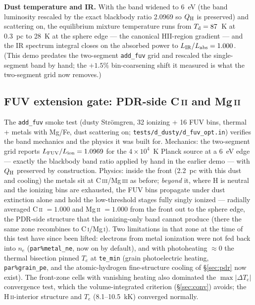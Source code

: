 \documentclass[english,a4paper]{my_memo}
\newcommand{\code}[1]{\texttt{#1}}
\begin{document}
\textbf{Dust temperature and IR.}  With the band widened to 6~eV
(the band luminosity rescaled by the exact blackbody ratio 2.0969 so
$Q_{\rm H}$ is preserved) and scattering on, the equilibrium mixture
temperature runs from $T_{\rm d} = 87$~K at 0.3~pc to 28~K at the
sphere edge --- the canonical HII-region gradient --- and the IR
spectrum integral closes on the absorbed power to
$L_{\rm IR}/L_{\rm abs} = 1.000$.  (This demo predates the two-segment
\code{add\_fuv} grid and rescaled the single-segment band by hand; the
$+1.5\%$ bin-coarsening shift it measured is what the two-segment grid
now removes.)

\subsection{FUV extension gate: PDR-side C\,\textsc{ii} and Mg\,\textsc{ii}}
The \code{add\_fuv} smoke test (dusty Str\"omgren, 32 ionizing + 16
FUV bins, thermal + metals with Mg/Fe, dust scattering on;
\code{tests/d\_dusty/d\_fuv\_opt.in}) verifies the band mechanics and
the physics it was built for.  Mechanics: the two-segment grid reports
$L_{\rm FUV}/L_{\rm ion} = 1.0969$ for the $4{\times}10^4$~K Planck
source at a 6~eV edge --- exactly the blackbody band ratio applied by
hand in the earlier demo --- with $Q_{\rm H}$ preserved by
construction.  Physics: inside the front (2.2~pc with this dust and
cooling) the metals sit at C\,\textsc{iii}/Mg\,\textsc{iii} as before;
\emph{beyond} it, where H is neutral and the ionizing bins are
exhausted, the FUV bins propagate under dust extinction alone and hold
the low-threshold stages fully singly ionized --- radially averaged
C\,\textsc{ii} $= 1.000$ and Mg\,\textsc{ii} $= 1.000$ from the front
out to the sphere edge, the PDR-side structure that the ionizing-only
band cannot produce (there the same zone recombines to
C\,\textsc{i}/Mg\,\textsc{i}).  Two limitations in that zone at the time
of this test have since been lifted: electrons from metal ionization were
not fed back into $n_e$ (\code{par\%metal\_ne}, now on by default), and with
photoheating $\approx 0$ the thermal bisection pinned $T_e$ at
\code{te\_min} (grain photoelectric heating, \code{par\%grain\_pe}, and the
atomic-hydrogen fine-structure cooling of \S\ref{sec:pdr} now exist).  The
front-zone cells with vanishing heating also dominated the
$\max|\Delta T_e|$ convergence test, which the volume-integrated criterion
(\S\ref{sec:conv}) avoids; the H\,\textsc{ii}-interior structure and $T_e$
(8.1--10.5~kK) converged normally.
\end{document}
